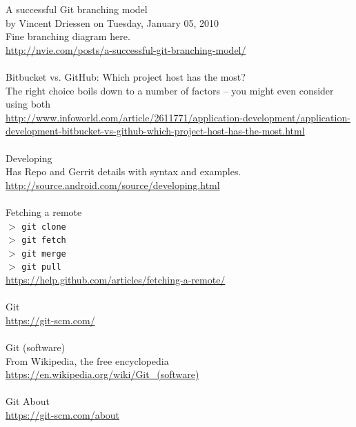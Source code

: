\documentclass[12pt,letterpaper,dvips]{article}
\newcommand{\cmd}[1]{\texttt{#1}}
\begin{document}
A successful Git branching model\\
by Vincent Driessen on Tuesday, January 05, 2010\\
Fine branching diagram here.\\
\href{http://nvie.com/posts/a-successful-git-branching-model/}{http://nvie.com/posts/a-successful-git-branching-model/}
\\
\\
Bitbucket vs. GitHub: Which project host has the most?\\
The right choice boils down to a number of factors -- you might even consider using both\\
\href{http://www.infoworld.com/article/2611771/application-development/application-development-bitbucket-vs-github-which-project-host-has-the-most.html}{http://www.infoworld.com/article/2611771/application-development/application-development-bitbucket-vs-github-which-project-host-has-the-most.html}
\\
\\
Developing\\
Has Repo and Gerrit details with syntax and examples.\\
\href{http://source.android.com/source/developing.html}{http://source.android.com/source/developing.html}
\\
\\
Fetching a remote\\
$>$ \cmd{git clone}\\
$>$ \cmd{git fetch}\\
$>$ \cmd{git merge}\\
$>$ \cmd{git pull}\\
\href{https://help.github.com/articles/fetching-a-remote/}{https://help.github.com/articles/fetching-a-remote/}
\\
\\
Git\\
\href{https://git-scm.com/}{https://git-scm.com/}
\\
\\
Git (software)\\
From Wikipedia, the free encyclopedia\\
\href{https://en.wikipedia.org/wiki/Git\_(software)}{https://en.wikipedia.org/wiki/Git\_(software)}
\\
\\
Git About\\
\href{https://git-scm.com/about}{https://git-scm.com/about}
\\
\end{document}
